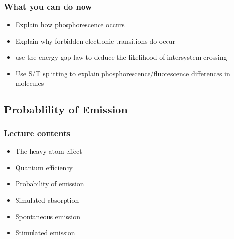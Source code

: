 \documentclass[ignorenonframetext]{beamer}
\begin{document}
\begin{frame}
\frametitle{What you can do now}
\begin{itemize}
\item Explain how phosphorescence occurs
\item Explain why forbidden electronic transitions do occur
\item use the energy gap law to deduce the likelihood of intersystem crossing
\item Use S/T splitting to explain phosphorescence/fluorescence differences in molecules
\end{itemize}
\end{frame}

\subsection{Probablility of Emission}

\begin{frame}
	\frametitle{Lecture contents}
		\begin{itemize}
			\item The heavy atom effect
			\item Quantum efficiency
			\item Probability of emission
			\item Simulated absorption
			\item Spontaneous emission
			\item Stimulated emission
		\end{itemize}
	\end{frame}
\end{document}
